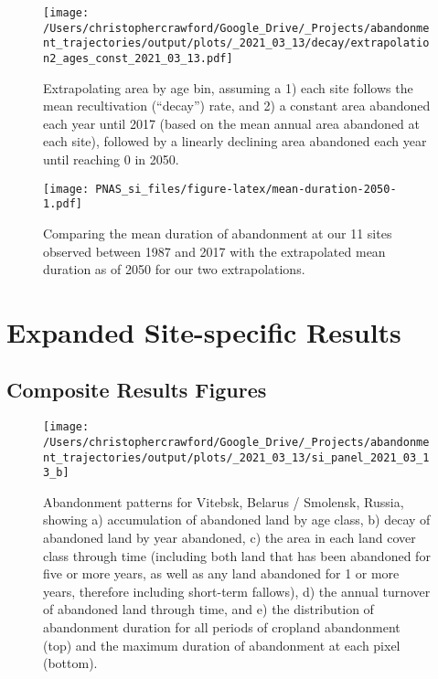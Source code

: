 \documentclass[9pt,twoside,lineno]{pnas-new}
\begin{document}
\begin{figure}
\centering
\texttt{[image: /Users/christophercrawford/Google\_Drive/\_Projects/abandonment\_trajectories/output/plots/\_2021\_03\_13/decay/extrapolation2\_ages\_const\_2021\_03\_13.pdf]}
\caption{\label{fig:extrapolation2-area-by-age}Extrapolating area by age bin, assuming a 1) each site follows the mean recultivation (``decay'') rate, and 2) a constant area abandoned each year until 2017 (based on the mean annual area abandoned at each site), followed by a linearly declining area abandoned each year until reaching 0 in 2050.}
\end{figure}



\begin{figure}
\centering
\texttt{[image: PNAS\_si\_files/figure-latex/mean-duration-2050-1.pdf]}
\caption{\label{fig:mean-duration-2050}Comparing the mean duration of abandonment at our 11 sites observed between 1987 and 2017 with the extrapolated mean duration as of 2050 for our two extrapolations.}
\end{figure}

\newpage

\hypertarget{expanded-site-specific-results}{%
\section{Expanded Site-specific Results}\label{expanded-site-specific-results}}

\hypertarget{composite-results-figures}{%
\subsection{Composite Results Figures}\label{composite-results-figures}}













\begin{figure}
\texttt{[image: /Users/christophercrawford/Google\_Drive/\_Projects/abandonment\_trajectories/output/plots/\_2021\_03\_13/si\_panel\_2021\_03\_13\_b]} \caption{Abandonment patterns for Vitebsk, Belarus / Smolensk, Russia, showing a) accumulation of abandoned land by age class, b) decay of abandoned land by year abandoned, c) the area in each land cover class through time (including both land that has been abandoned for five or more years, as well as any land abandoned for 1 or more years, therefore including short-term fallows), d) the annual turnover of abandoned land through time, and e) the distribution of abandonment duration for all periods of cropland abandonment (top) and the maximum duration of abandonment at each pixel (bottom).}\label{fig:panel-b}
\end{figure}
\end{document}
